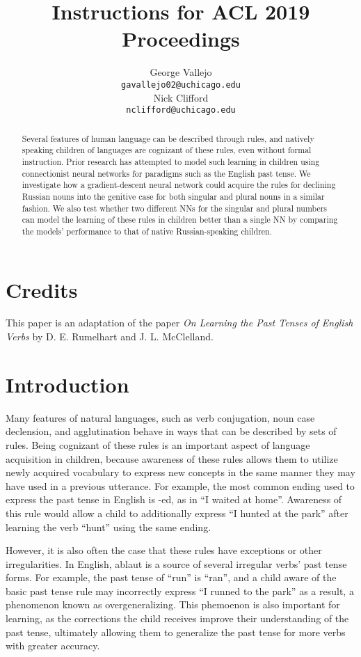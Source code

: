 \documentclass[11pt,a4paper]{article}
\title{Instructions for ACL 2019 Proceedings}
\author{George Vallejo \\
  \texttt{gavallejo02@uchicago.edu} \\\And
  Nick Clifford \\
  \texttt{nclifford@uchicago.edu} \\}
\date{}
\begin{document}
\maketitle
\begin{abstract}
  Several features of human language can be described through rules,
  and natively speaking children of languages are cognizant of these rules, 
  even without formal instruction. Prior research has attempted to model
  such learning in children using connectionist neural networks for
  paradigms such as the English past tense. We investigate how a gradient-descent
  neural network could acquire the rules for declining Russian nouns into
  the genitive case for both singular and plural nouns in a similar fashion. 
  We also test whether two different NNs for the singular and plural numbers
  can model the learning of these rules in children better than a single
  NN by comparing the models' performance to that of native Russian-speaking children.

\end{abstract}

\section{Credits}

  This paper is an adaptation of the paper
  \emph{On Learning the Past Tenses of English Verbs} by D. E. Rumelhart and
  J. L. McClelland.

\section{Introduction}

Many features of natural languages, such as verb conjugation, noun case
declension, and agglutination behave in ways that can be described
by sets of rules. Being cognizant of these rules is an important aspect
of language acquisition in children, because awareness of these rules allows
them to utilize newly acquired vocabulary to express new concepts in the same
manner they may have used in a previous utterance. For example, the most common
ending used to express the past tense in English is -ed, as in ``I waited at home''.
Awareness of this rule would allow a child to additionally express ``I hunted at
the park'' after learning the verb ``hunt'' using the same ending.

However, it is also often the case that these rules have exceptions or other
irregularities. In English, ablaut is a source of several irregular verbs'
past tense forms. For example, the past tense of ``run'' is ``ran'', and
a child aware of the basic past tense rule may incorrectly express
``I runned to the park'' as a result, a phenomenon known as overgeneralizing.
This phemoenon is also important for learning, as the corrections the child
receives improve their understanding of the past tense, ultimately allowing
them to generalize the past tense for more verbs with greater accuracy.
\end{document}
